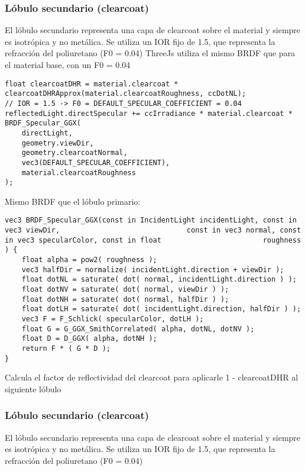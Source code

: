         \subsubsection{L\'obulo secundario (clearcoat)}
            El l\'obulo secundario representa una capa de clearcoat sobre el material y siempre es isotr\'opica
            y no met\'alica. Se utiliza un IOR fijo de 1.5, que representa la refracci\'on del poliuretano (F0 = 0.04)
            ThreeJs utiliza el mismo BRDF que para el material base, con un F0 = 0.04
            \singlespacing
            \begin{lstlisting}[caption=My Javascript Example]
float clearcoatDHR = material.clearcoat * clearcoatDHRApprox(material.clearcoatRoughness, ccDotNL);
// IOR = 1.5 -> F0 = DEFAULT_SPECULAR_COEFFICIENT = 0.04
reflectedLight.directSpecular += ccIrradiance * material.clearcoat * BRDF_Specular_GGX(
    directLight,
    geometry.viewDir,
    geometry.clearcoatNormal,
    vec3(DEFAULT_SPECULAR_COEFFICIENT),
    material.clearcoatRoughness
);
            \end{lstlisting}
            \singlespacing
            Mismo BRDF que el l\'obulo primario:
            \singlespacing
            \begin{lstlisting}[caption=My Javascript Example]
vec3 BRDF_Specular_GGX(const in IncidentLight incidentLight, const in vec3 viewDir,                              const in vec3 normal, const in vec3 specularColor, const in float                        roughness ) {
    float alpha = pow2( roughness );
    vec3 halfDir = normalize( incidentLight.direction + viewDir );
    float dotNL = saturate( dot( normal, incidentLight.direction ) );
    float dotNV = saturate( dot( normal, viewDir ) );
    float dotNH = saturate( dot( normal, halfDir ) );
    float dotLH = saturate( dot( incidentLight.direction, halfDir ) );
    vec3 F = F_Schlick( specularColor, dotLH );
    float G = G_GGX_SmithCorrelated( alpha, dotNL, dotNV );
    float D = D_GGX( alpha, dotNH );
    return F * ( G * D );
}
            \end{lstlisting}
            \singlespacing
            Calcula el factor de reflectividad del clearcoat para aplicarle
            1 - clearcoatDHR al siguiente l\'obulo

        \subsubsection{L\'obulo secundario (clearcoat)}
            El l\'obulo secundario representa una capa de clearcoat sobre el material y
            siempre es isotr\'opica y no met\'alica.
            Se utiliza un IOR fijo de 1.5, que representa la refracci\'on del poliuretano (F0 = 0.04)
        
